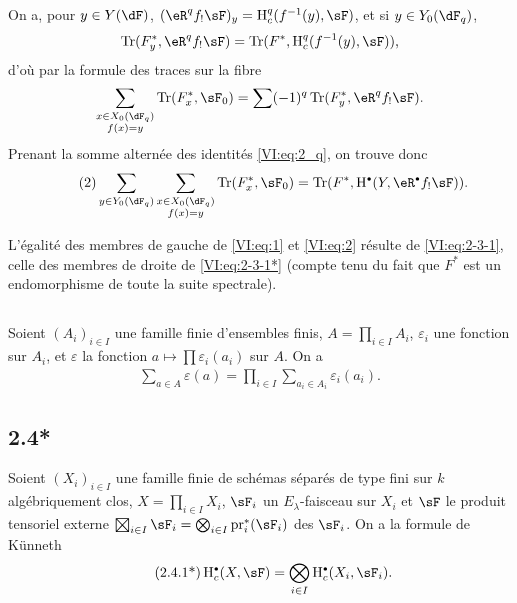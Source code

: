 On a, pour $y\in Y(\dF)$, $(\eR^q f_! \sF)_y = \h_c^q(f^{-1}(y),\sF)$, et si 
$y\in Y_0(\dF_q)$, 
\[
  \tr(F_y^\ast,\eR^q f_! \sF) = \tr(F^\ast,\h_c^q(f^{-1}(y),\sF)) \text{,}
\]
d'où par la formule des traces sur la fibre 
\[
  \sum_{\substack{x\in X_0(\dF_q) \\ f(x) = y}} \tr(F_x^\ast,\sF_0) = \sum (-1)^q \tr(F_y^\ast,\eR^q f_! \sF) \text{.}
\]
Prenant la somme alternée des identités \eqref{VI:eq:2_q}, on trouve donc 
\begin{align*}\tag{2}\label{VI:eq:2}
  \sum_{y\in Y_0(\dF_q)} \sum_{\substack{x \in X_0(\dF_q) \\ f(x) = y}} \tr(F_x^\ast,\sF_0) = \tr(F^\ast,\h^\bullet(Y,\eR^\bullet f_! \sF)) \text{.}
\end{align*}

L'égalité des membres de gauche de \eqref{VI:eq:1} et \eqref{VI:eq:2} 
résulte de \eqref{VI:eq:2-3-1}, celle des membres de droite de 
\eqref{VI:eq:2-3-1*} (compte tenu du fait que $F^\ast$ est un endomorphisme de 
toute la suite spectrale). 





\subsection{}\label{VI:2-4}

Soient $(A_i)_{i\in I}$ une famille finie d'ensembles finis, 
$A=\prod_{i\in I} A_i$, $\varepsilon_i$ une fonction sur $A_i$, et 
$\varepsilon$ la fonction $a\mapsto \prod \varepsilon_i(a_i)$ sur $A$. On a 
\begin{align*}\tag{2.4.1}\label{VI:eq:2-4-1}
  \sum_{a\in A} \varepsilon(a) = \prod_{i\in I} \sum_{a_i\in A_i} \varepsilon_i(a_i) \text{.}
\end{align*}





\subsection*{2.4*}\label{VI:2-4*}

Soient $(X_i)_{i\in I}$ une famille finie de schémas séparés de type fini 
sur $k$ algébriquement clos, $X=\prod_{i\in I} X_i$, $\sF_i$ un 
$E_\lambda$-faisceau sur $X_i$ et $\sF$ le produit tensoriel externe 
$\bigboxtimes_{i\in I}\sF_i = \bigotimes_{i\in I} \pr_i^\ast(\sF_i)$ 
des $\sF_i$. On a la formule de K\"unneth 
\begin{align*}\tag{2.4.1*}\label{VI:eq:2-4-1*}
  \h_c^\bullet(X,\sF) = \bigotimes_{i\in I} \h_c^\bullet(X_i,\sF_i) \text{.}
\end{align*}

